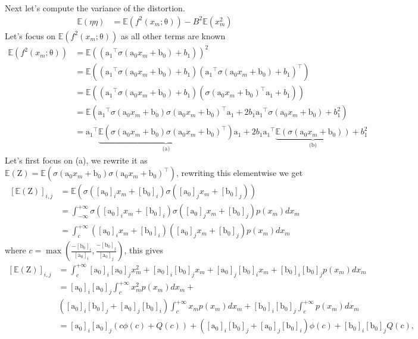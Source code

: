 \documentclass[12pt]{article}
\newcommand{\vect}[1]{\boldsymbol{\mathrm{#1}}}
\newcommand{\mat}[1]{\boldsymbol{\mathrm{#1}}}
\newcommand{\expt}[1]{\mathbb{E}\left(#1\right)}
\theoremstyle{remark}
\begin{document}
Next let's compute the variance of the distortion. 
\begin{align}
	\expt{\eta \eta} &= \expt{f^2(x_m; \vect{\theta})} - B^2\expt{x_m^2}
\end{align}
Let's focus on $\expt{f^2(x_m; \vect{\theta})}$ as all other terms are known
\begin{align}
	\expt{f^2(x_m; \vect{\theta})} &= \expt{\left(\vect{a_1}^{\intercal}\sigma(\vect{a_0}x_m + \vect{b_0}) + b_1\right)}^2\\
	&= \expt{\left(\vect{a_1}^{\intercal}\sigma(\vect{a_0}x_m + \vect{b_0}) + b_1\right)\left(\vect{a_1}^{\intercal}\sigma(\vect{a_0}x_m + \vect{b_0}) + b_1\right)^{\intercal}}\\
	&= \expt{\left(\vect{a_1}^{\intercal}\sigma(\vect{a_0}x_m + \vect{b_0}) + b_1\right)\left(\sigma(\vect{a_0}x_m + \vect{b_0})^{\intercal} \vect{a_1}+ b_1\right)}\\
	&= \expt{\vect{a_1}^{\intercal} \sigma(\vect{a_0}x_m + \vect{b_0}) \sigma(\vect{a_0}x_m + \vect{b_0})^{\intercal} \vect{a_1} + 2 b_1 \vect{a_1}^{\intercal} \sigma(\vect{a_0}x_m + \vect{b_0}) + b_1^2}\\
	&= \vect{a_1}^{\intercal}\underbrace{\expt{ \sigma(\vect{a_0}x_m + \vect{b_0}) \sigma(\vect{a_0}x_m + \vect{b_0})^{\intercal}}}_{\text{(a)}}\vect{a_1} + 2b_1 \vect{a_1}^{\intercal} \underbrace{\expt{\sigma(\vect{a_0}x_m + \vect{b_0})}}_{\text{(b)}} + b_1^2
\end{align}
Let's first focus on (a), we rewrite it as $\expt{\mat{Z}} = \expt{ \sigma(\vect{a_0}x_m + \vect{b_0}) \sigma(\vect{a_0}x_m + \vect{b_0})^{\intercal}}$, rewriting this elementwise we get
\begin{align}
	\left[\expt{\mat{Z}}\right]_{i,j} &= \expt{\sigma([\vect{a_0}]_i x_m + [\vect{b_0}]_i) \sigma([\vect{a_0}]_j x_m + [\vect{b_0}]_j)}\\
	&= \int_{-\infty}^{+\infty} \sigma([\vect{a_0}]_i x_m + [\vect{b_0}]_i) \sigma([\vect{a_0}]_j x_m + [\vect{b_0}]_j) p(x_m)dx_m \\
	&= \int_{c}^{+\infty} ([\vect{a_0}]_i x_m + [\vect{b_0}]_i) ([\vect{a_0}]_j x_m + [\vect{b_0}]_j) p(x_m)dx_m 
\end{align}
where $c = \max\left(\frac{-[\vect{b_0}]_i}{[\vect{a_0}]_i}, \frac{-[\vect{b_0}]_j}{[\vect{a_0}]_j}\right)$, this gives
\begin{align}
	\left[\expt{\mat{Z}}\right]_{i,j} &= \int_{c}^{+\infty} [\vect{a_0}]_i [\vect{a_0}]_j x_m^2 + [\vect{a_0}]_i [\vect{b_0}]_j x_m + [\vect{a_0}]_j [\vect{b_0}]_i x_m + [\vect{b_0}]_i [\vect{b_0}]_j p(x_m)dx_m \\
	&= [\vect{a_0}]_i [\vect{a_0}]_j \int_{c}^{+\infty} x_m^2 p(x_m)dx_m + \\
	\quad&\left([\vect{a_0}]_i [\vect{b_0}]_j  + [\vect{a_0}]_j [\vect{b_0}]_i \right) \int_{c}^{+\infty} x_m p(x_m)dx_m +  [\vect{b_0}]_i [\vect{b_0}]_j \int_{c}^{+\infty} p(x_m)dx_m \\
	&= [\vect{a_0}]_i [\vect{a_0}]_j \left(c \phi(c) + Q(c) \right) + \left([\vect{a_0}]_i [\vect{b_0}]_j  + [\vect{a_0}]_j [\vect{b_0}]_i \right) \phi(c) +  [\vect{b_0}]_i [\vect{b_0}]_j Q(c),
\end{align}
\end{document}
